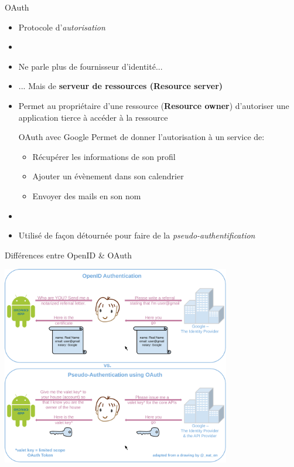 \documentclass{beamer}
\begin{document}
\begin{frame}{OAuth}
  \begin{center}
    \begin{itemize}
      \item Protocole d'\emph{autorisation}
      \item[~]
      \item Ne parle plus de fournisseur d'identité...
      \item ... Mais de \textbf{serveur de ressources (Resource server)}
      \item Permet au propriétaire d'une ressource (\textbf{Resource owner}) d'autoriser une application tierce à accéder à la ressource
      \pause
      \begin{exampleblock}{OAuth avec Google}
        Permet de donner l'autorisation à un service de:
        \pause
        \begin{itemize}
          \item Récupérer les informations de son profil
          \pause
          \item Ajouter un évènement dans son calendrier
          \pause
          \item Envoyer des mails en son nom
        \end{itemize}
      \end{exampleblock}
      \pause
      \item[~]
      \item Utilisé de façon détournée pour faire de la \emph{pseudo-authentification}
    \end{itemize}
  \end{center}
\end{frame}

\begin{frame}{Différences entre OpenID \& OAuth}
  \begin{center}
    \includegraphics[width=0.75\textwidth]{img/OpenIDvsPseudo-AuthenticationusingOAuth}
  \end{center}
\end{frame}
\end{document}
